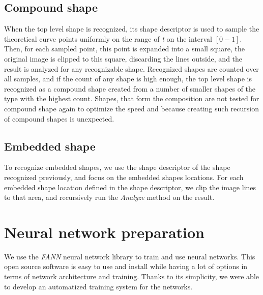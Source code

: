 \begin{description}
\subsection{Compound shape}
When the top level shape is recognized, its shape descriptor is used to sample the theoretical curve points uniformly on the range of \emph{t} on the interval $[0-1]$. Then, for each sampled point, this point is expanded into a small square, the original image is clipped to this square, discarding the lines outside, and the result is analyzed for any recognizable shape. Recognized shapes are counted over all samples, and if the count of any shape is high enough, the top level shape is recognized as a compound shape created from a number of smaller shapes of the type with the highest count. Shapes, that form the composition are not tested for compound shape again to optimize the speed and because creating such recursion of compound shapes is unexpected.

\subsection{Embedded shape}
To recognize embedded shapes, we use the shape descriptor of the shape recognized previously, and focus on the embedded shapes locations. For each embedded shape location defined in the shape descriptor, we clip the image lines to that area, and recursively run the \emph{Analyze} method on the result.

\section{Neural network preparation}
We use the \emph{FANN} neural network library to train and use neural networks. This open source software is easy to use and install while having a lot of options in terms of network architecture and training. Thanks to its simplicity, we were able to develop an automatized training system for the networks.


\end{description}
